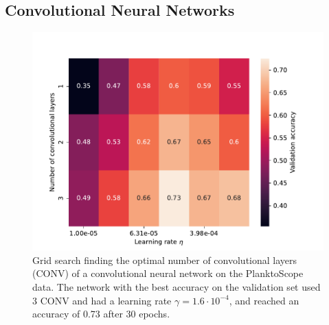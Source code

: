 
\subsection{Convolutional Neural Networks}

\begin{figure}
    \centering
    \includegraphics[width=\linewidth]{examples/tests_even/figs/gridsearch-nconv-128-2024-12-12_1108.pdf}
    \caption{Grid search finding the optimal number of convolutional layers (CONV) of a convolutional neural network on the PlanktoScope data. The network with the best accuracy on the validation set used 3 CONV and had a learning rate $\gamma = 1.6 \cdot 10^{-4}$, and reached an accuracy of 0.73 after 30 epochs.}
    \label{fig:gridsearch-nconv}
\end{figure}

